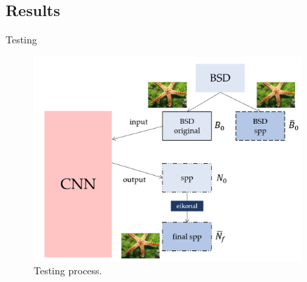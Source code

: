 \documentclass[9pt]{beamer}
\begin{document}
\subsection{Results}
\begin{frame}{Testing}
\begin{figure}
    \centering
    \includegraphics[width=0.9\textwidth]{pics/schema-test-img.png}
    \caption{Testing process.}
\end{figure}

\end{frame}
\end{document}
